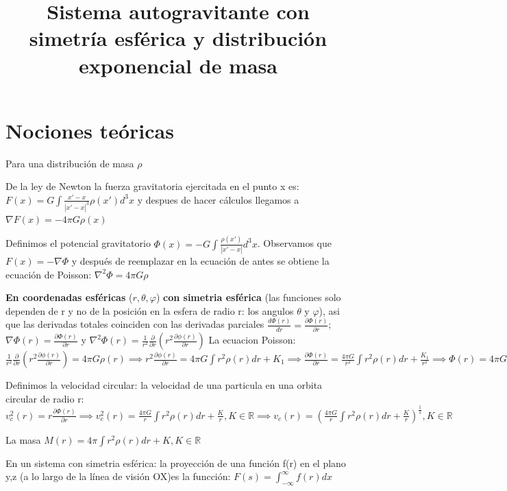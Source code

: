 \documentclass[12pt]{book}
\title{Sistema autogravitante con simetría esférica y distribución exponencial de masa}
\date{}
\begin{document}
\section*{Nociones teóricas}

Para una distribución de masa $\rho$

\begin{description}
\item De la ley de Newton la fuerza gravitatoria ejercitada en el punto x es:  $F(x) = G \int{\frac{x\prime - x}{|x\prime - x|^3}\rho(x\prime)d^3x} $ y despues de hacer cálculos llegamos a $ \nabla F(x) = -4\pi G \rho(x) $
\item Definimos el potencial gravitatorio $\Phi(x) = -G \int{\frac{\rho(x\prime)}{|x\prime - x|}d^3x} $. Observamos que $F(x) = - \nabla \Phi $ y después de reemplazar en la ecuación de antes se obtiene la ecuación de Poisson: $\nabla^2 \Phi = 4\pi G \rho $
\item \textbf{En coordenadas esféricas} ($r,\theta,\varphi$) \textbf{con simetria esférica} 
(las funciones solo dependen de r y no de la posición en la esfera de radio r: los angulos $\theta$ y $\varphi$), asi que las derivadas totales coinciden con las derivadas parciales $\frac {d\Phi(r)}{dr} = \frac{\partial \Phi(r)}{\partial r} $; 
$\nabla \Phi(r) = \frac{\partial \Phi(r)}{\partial r} $ y 
$\nabla^2 \Phi(r) = \frac{1}{r^2} \frac{\partial }{\partial r}(r^2 \frac{\partial \phi(r)}{\partial r})$
La ecuacion Poisson:$ \frac{1}{r^2} \frac{\partial }{\partial r}(r^2 \frac{\partial \phi(r)}{\partial r}) = 4\pi G \rho(r) \implies
r^2 \frac{\partial \phi(r)}{\partial r} = 4\pi G \int{r^2\rho(r)dr} + K_1 \implies
\frac{\partial \Phi(r)}{\partial r} = \frac{4 \pi G}{r^2}\int{r^2\rho(r)dr} + \frac{K_1}{r^2}\implies
\Phi(r) = 4\pi G \int{\frac{1}{r^2}(\int{r^2\rho(r)dr})dr } + K_1\int{\frac{1}{r^2}dr} + K_2
=4\pi G \int{\frac{1}{r^2}(\int{r^2\rho(r)dr})dr } + \frac{K_1}{r} + K_2, K_1, K_2 \in \mathbb{R} (el signo - con K_1)
 $
\item Definimos la velocidad circular: la velocidad de una particula en una orbita circular de radio r:
$v_c^2(r) = r\frac{\partial \Phi(r)}{\partial r} \implies
v_c^2(r) = \frac{4\pi G}{r}\int{r^2\rho(r)dr} + \frac{K}{r}, K \in \mathbb{R} \implies 
v_c(r) = (\frac{4 \pi G}{r}\int{r^2\rho(r)dr} + \frac{K}{r})^{\frac{1}{2}}, K \in \mathbb{R}
$
\item La masa $M(r) = 4 \pi \int{r^2\rho(r)dr} + K, K \in \mathbb{R}$
\item En un sistema con simetria esférica: la proyección de una función f(r) en el plano y,z (a lo largo de la línea de visión OX)es la funcción: 
$F(s) = \int_{-\infty}^\infty{f(r)dx}$


\end{description}
\end{document}
